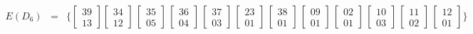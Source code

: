 \[\begin{array}{rcl}
E(D_6) &=& \{ \begin{bmatrix} 39 \\ 13 \end{bmatrix} \begin{bmatrix} 34 \\ 12 \end{bmatrix}\,\begin{bmatrix} 35 \\ 05 \end{bmatrix}\,\begin{bmatrix} 36 \\ 04 \end{bmatrix}\,\begin{bmatrix} 37 \\ 03 \end{bmatrix}\,\begin{bmatrix} 23 \\ 01 \end{bmatrix}\,\begin{bmatrix} 38 \\ 01 \end{bmatrix}\,\begin{bmatrix} 09 \\ 01 \end{bmatrix}\,\begin{bmatrix} 02 \\ 01 \end{bmatrix}\,\begin{bmatrix} 10 \\ 03 \end{bmatrix}\,\begin{bmatrix} 11 \\ 02 \end{bmatrix}\,\begin{bmatrix} 12 \\ 01 \end{bmatrix} \} \\[1.8em]
\end{array}\]
